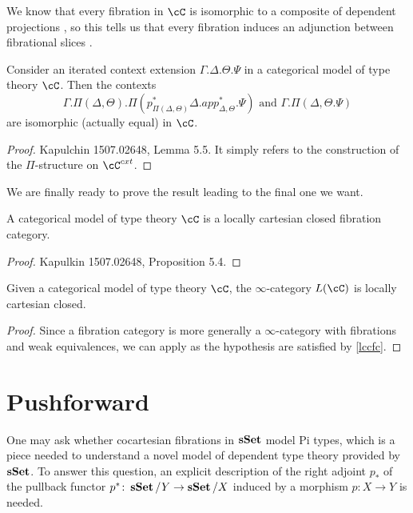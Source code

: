 \documentclass[a4paper,12pt]{scrartcl}
\begin{document}
We know that every fibration in $\cC$ is isomorphic to a composite of dependent
projections , so this tells us that every fibration induces an adjunction
between fibrational slices .

\begin{lem}
  Consider an iterated context extension $\Gamma.\Delta.\Theta.\Psi$ in a
  categorical model of type theory $\cC$. Then the contexts
  \[\Gamma.\Pi(\Delta,\Theta).\Pi(p^*_{\Pi(\Delta,\Theta)}\Delta.app^*_{\Delta,\Theta}.\Psi)
    \text{ and }
  \Gamma.\Pi(\Delta,\Theta.\Psi)\]
  are isomorphic (actually equal) in $\cC$.
\end{lem}
\begin{proof}
  Kapulchin 1507.02648, Lemma 5.5. It simply refers to the construction of the
  $\Pi$-structure on $\cC^{cxt}$.
\end{proof}

We are finally ready to prove the result leading to the final one we want.

\begin{prop}\label{lccfc}
  A categorical model of type theory $\cC$ is a locally cartesian closed
  fibration category.
\end{prop}
\begin{proof}
  Kapulkin 1507.02648, Proposition 5.4.
\end{proof}

\begin{thm}
  Given a categorical model of type theory $\cC$, the $\infty$-category $L(\cC)$
  is locally cartesian closed.
\end{thm}
\begin{proof}
  Since a fibration category is more generally a $\infty$-category with
  fibrations and weak equivalences, we can apply \cite[Prop.\ 7.6.16]{Cis19} as
  the hypothesis are satisfied by \ref{lccfc}.
\end{proof}

\section{Pushforward}

One may ask whether cocartesian fibrations in $\operatorname{\mathbf{sSet}}$ model Pi types, which is a
piece needed to understand a novel model of dependent type theory provided by
$\operatorname{\mathbf{sSet}}$. To answer this question, an explicit description of the right adjoint
$p_*$ of the pullback functor $p^*\colon\operatorname{\mathbf{sSet}}/Y\rightarrow\operatorname{\mathbf{sSet}}/X$ induced by a
morphism $p\colon X\rightarrow Y$ is needed.
\end{document}
